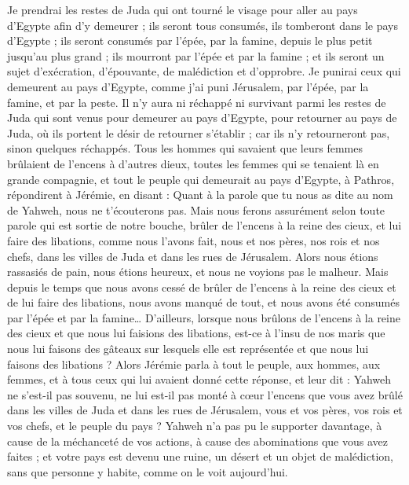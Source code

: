 \begin{multicols}{2}
Je prendrai les restes de Juda qui ont tourné le visage pour aller au pays d'Egypte afin d'y demeurer ; ils seront tous consumés, ils tomberont dans le pays d'Egypte ; ils seront consumés par l'épée, par la famine, depuis le plus petit jusqu'au plus grand ; ils mourront par l'épée et par la famine ; et ils seront un sujet d'exécration, d'épouvante, de malédiction et d'opprobre.
Je punirai ceux qui demeurent au pays d'Egypte, comme j'ai puni Jérusalem, par l'épée, par la famine, et par la peste.
Il n'y aura ni réchappé ni survivant parmi les restes de Juda qui sont venus pour demeurer au pays d'Egypte, pour retourner au pays de Juda, où ils portent le désir de retourner s'établir ; car ils n'y retourneront pas, sinon quelques réchappés.
Tous les hommes qui savaient que leurs femmes brûlaient de l'encens à d'autres dieux, toutes les femmes qui se tenaient là en grande compagnie, et tout le peuple qui demeurait au pays d'Egypte, à Pathros, répondirent à Jérémie, en disant :
Quant à la parole que tu nous as dite au nom de Yahweh, nous ne t'écouterons pas.
Mais nous ferons assurément selon toute parole qui est sortie de notre bouche, brûler de l'encens à la reine des cieux, et lui faire des libations, comme nous l'avons fait, nous et nos pères, nos rois et nos chefs, dans les villes de Juda et dans les rues de Jérusalem. Alors nous étions rassasiés de pain, nous étions heureux, et nous ne voyions pas le malheur.
Mais depuis le temps que nous avons cessé de brûler de l'encens à la reine des cieux et de lui faire des libations, nous avons manqué de tout, et nous avons été consumés par l'épée et par la famine…
D'ailleurs, lorsque nous brûlons de l'encens à la reine des cieux et que nous lui faisions des libations, est-ce à l'insu de nos maris que nous lui faisons des gâteaux sur lesquels elle est représentée et que nous lui faisons des libations ?
Alors Jérémie parla à tout le peuple, aux hommes, aux femmes, et à tous ceux qui lui avaient donné cette réponse, et leur dit :
Yahweh ne s'est-il pas souvenu, ne lui est-il pas monté à cœur l'encens que vous avez brûlé dans les villes de Juda et dans les rues de Jérusalem, vous et vos pères, vos rois et vos chefs, et le peuple du pays ?
Yahweh n'a pas pu le supporter davantage, à cause de la méchanceté de vos actions, à cause des abominations que vous avez faites ; et votre pays est devenu une ruine, un désert et un objet de malédiction, sans que personne y habite, comme on le voit aujourd'hui.

\end{multicols}
